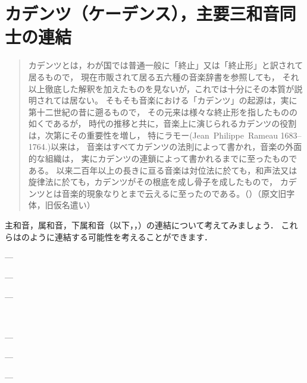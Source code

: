 \documentclass[dvipdfmx,uplatex,b5paper,openany,jbase=12Q,nomag*,textwidth-limit=44%
               ]{gachimuchi}
\begin{document}
\section{カデンツ（ケーデンス），主要三和音同士の連結}
\begin{quotation}
カデンツとは，わが国では普通一般に「終止」又は「終止形」と訳されて居るもので，
現在市販されて居る五六種の音楽辞書を参照しても，
それ以上徹底した解釈を加えたものを見ないが，これでは十分にその本質が説明されては居ない。
そもそも音楽における「カデンツ」の起源は，実に第十二世紀の昔に遡るもので，
その元来は様々な終止形を指したものの如くであるが，
時代の推移と共に，音楽上に演じられるカデンツの役割は，次第にその重要性を増し，
特にラモー(Jean~Philippe~Rameau 1683--1764.)以来は，
音楽はすべてカデンツの法則によって書かれ，音楽の外面的な組織は，
実にカデンツの連鎖によって書かれるまでに至ったものである。
以来二百年以上の長きに亘る音楽は対位法に於ても，和声法又は旋律法に於ても，カデンツがその根底を成し骨子を成したもので，
カデンツとは音楽的現象なりとまで云えるに至ったのである。（）（原文旧字体，旧仮名遣い）
\end{quotation}

主和音，属和音，下属和音（以下，，）の連結について考えてみましょう．
これらはのように連結する可能性を考えることができます\cite[p.22]{chTHUILLE1}．
\begin{enumerate}
  \begin{minipage}{.35\linewidth}\item {}---\end{minipage}%
  \begin{minipage}{.35\linewidth}\item {}---\end{minipage}%
  \begin{minipage}{.3\linewidth }\item {}---\end{minipage}\\%
  \begin{minipage}{.35\linewidth}\item {}---\end{minipage}%
  \begin{minipage}{.35\linewidth}\item {}---\end{minipage}%
  \begin{minipage}{.3\linewidth }\item {}---\end{minipage}%
\end{enumerate}
\end{document}
